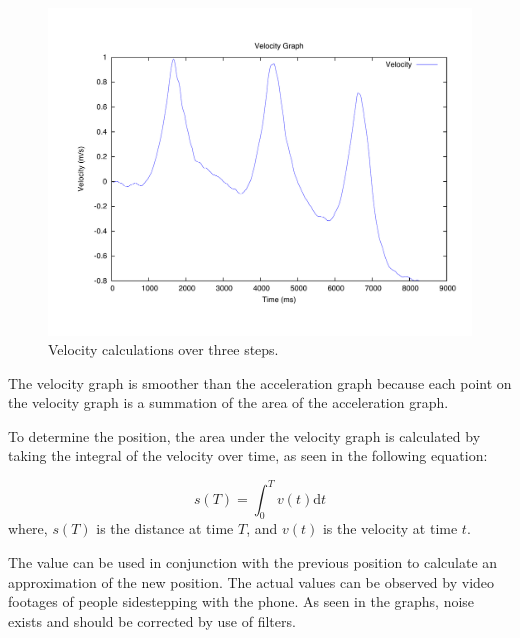\begin{figure}[H]
	\centering	
	\includegraphics[scale=0.4, trim=0cm 2cm 0cm 2cm]{media/gnuplot/velocity.pdf}
	\caption{Velocity calculations over three steps.}
	\label{figure:velocity-chart}
\end{figure}

The velocity graph is smoother than the acceleration graph because each point on the velocity graph is a summation of the area of the acceleration graph.

To determine the position, the area under the velocity graph is calculated by taking the integral of the velocity over time, as seen in the following equation:

\begin{equation}\label{eq:integral-velocity}
     s(T) = \int_0^T v(t)\mathrm{d}t 
\end{equation}
where, $s(T)$ is the distance at time $T$, and $v(t)$ is the velocity at time $t$. 

The value can be used in conjunction with the previous position to calculate an approximation of the new position.
The actual values can be observed by video footages of people sidestepping with the phone.
As seen in the graphs, noise exists and should be corrected by use of filters.